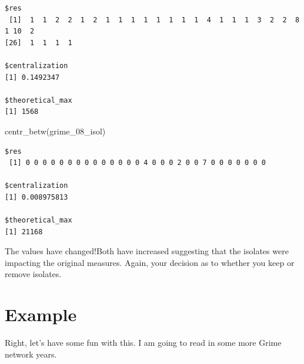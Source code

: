 \documentclass[
  letterpaper,
  DIV=11,
  numbers=noendperiod]{scrreprt}
\newenvironment{Shaded}{\begin{snugshade}}{\end{snugshade}}
\newcommand{\FunctionTok}[1]{\textcolor[rgb]{0.28,0.35,0.67}{#1}}
\newcommand{\NormalTok}[1]{\textcolor[rgb]{0.00,0.23,0.31}{#1}}
\begin{document}
\begin{verbatim}
$res
 [1]  1  1  2  2  1  2  1  1  1  1  1  1  1  1  4  1  1  1  3  2  2  8  1 10  2
[26]  1  1  1  1

$centralization
[1] 0.1492347

$theoretical_max
[1] 1568
\end{verbatim}

\begin{Shaded}
\begin{Highlighting}[]
\FunctionTok{centr\_betw}\NormalTok{(grime\_08\_isol)}
\end{Highlighting}
\end{Shaded}

\begin{verbatim}
$res
 [1] 0 0 0 0 0 0 0 0 0 0 0 0 0 0 4 0 0 0 2 0 0 7 0 0 0 0 0 0 0

$centralization
[1] 0.008975813

$theoretical_max
[1] 21168
\end{verbatim}

The values have changed!Both have increased suggesting that the isolates
were impacting the original measures. Again, your decision as to whether
you keep or remove isolates.

\section{Example}\label{example}

Right, let's have some fun with this. I am going to read in some more
Grime network years.
\end{document}
